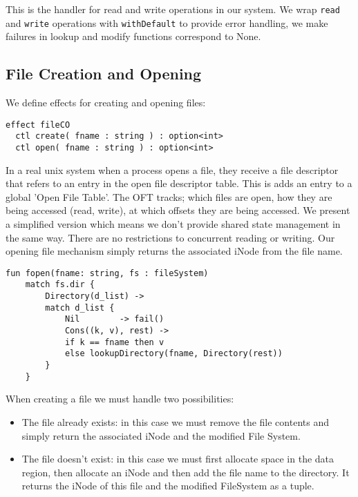 \documentclass[logo,bsc,singlespacing,parskip]{infthesis}
\begin{document}
This is the handler for read and write operations in our system. We wrap \texttt{read} and \texttt{write} operations with \texttt{withDefault} to provide error handling, we make failures in lookup and modify functions correspond to None.

\subsection*{File Creation and Opening}

We define effects for creating and opening files:

\begin{lstlisting}
effect fileCO
  ctl create( fname : string ) : option<int>
  ctl open( fname : string ) : option<int>
\end{lstlisting}

In a real unix system when a process opens a file, they receive a file descriptor that refers to an entry in the open file descriptor table. This is adds an entry to a global 'Open File Table'. The OFT tracks; which files are open, how they are being accessed (read, write), at which offsets they are being accessed. We present a simplified version which means we don't provide shared state management in the same way. There are no restrictions to concurrent reading or writing. Our opening file mechanism simply returns the associated iNode from the file name.

\begin{lstlisting}
fun fopen(fname: string, fs : fileSystem) 
    match fs.dir {
        Directory(d_list) ->
        match d_list {
            Nil        -> fail()  
            Cons((k, v), rest) ->
            if k == fname then v
            else lookupDirectory(fname, Directory(rest))
        }
    }
\end{lstlisting}    


When creating a file we must handle two possibilities:
\begin{itemize}
    \item The file already exists: in this case we must remove the file contents and simply return the associated  iNode and the modified File System.
    \item The file doesn't exist: in this case we must first allocate space in the data region, then allocate an iNode and then add the file name to the directory. It returns the iNode of this file and the modified FileSystem as a tuple.
\end{itemize}
\end{document}
